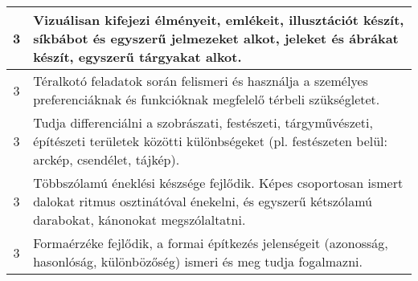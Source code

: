 \begin{longtable}{c | p{12cm} }
                                
                                          3 &  Vizuálisan kifejezi élményeit, emlékeit, illusztációt készít, síkbábot és egyszerű jelmezeket alkot, jeleket és ábrákat készít, egyszerű tárgyakat alkot. \\ \hline
                                          3 &  Téralkotó feladatok során felismeri és használja a személyes preferenciáknak és funkcióknak megfelelő térbeli szükségletet. \\ \hline
                                          3 &  Tudja  differenciálni a szobrászati, festészeti, tárgyművészeti, építészeti területek közötti különbségeket (pl. festészeten belül: arckép, csendélet, tájkép). \\ \hline
                                          3 &  Többszólamú éneklési készsége fejlődik. Képes csoportosan ismert dalokat ritmus osztinátóval énekelni, és egyszerű kétszólamú darabokat, kánonokat megszólaltatni. \\ \hline
                                          3 &  Formaérzéke fejlődik, a formai építkezés jelenségeit (azonosság, hasonlóság, különbözőség) ismeri és meg tudja fogalmazni. \\ \hline
                                      

\end{longtable}
